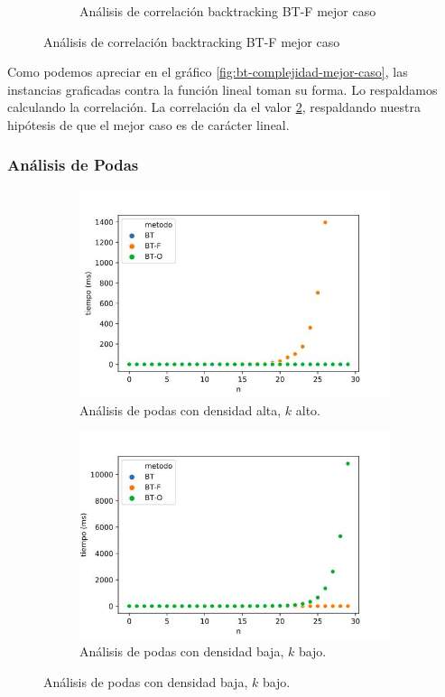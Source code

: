 \documentclass[10pt,a4paper]{article}
\begin{document}
\begin{figure}[h!]
\begin{subfigure}{0.4\linewidth}
		\caption{Análisis de correlación backtracking BT-F mejor caso}
		\label{fig:bt-correlacion-mejor-caso}
\end{subfigure}
\end{figure}
\newline
Como podemos apreciar en el gráfico \ref{fig:bt-complejidad-mejor-caso}, las instancias graficadas contra la función lineal toman su forma. Lo respaldamos calculando la correlación.
La correlación da el valor \ref{fig:bt-correlacion-mejor-caso}, respaldando nuestra hipótesis de que el mejor caso es de carácter lineal.
\subsubsection{Análisis de Podas}
\begin{figure}[h!]
	\centering
	\begin{subfigure}{0.45\linewidth}
		\centering
		\includegraphics[scale=0.3]{img/bt-podas-alta.jpg}
		\caption{Análisis de podas con densidad alta, $k$ alto.}
		\label{fig:bt-poda-alto}
	\end{subfigure}
	\begin{subfigure}{0.45\linewidth}
		\centering
		\includegraphics[scale=0.3]{img/bt-podas-baja.jpg}
		\caption{Análisis de podas con densidad baja, $k$ bajo.}
		\label{fig:bt-poda-bajo}
	\end{subfigure}
	\label{fig:exp-bt-podas}
\end{figure}
\end{document}
